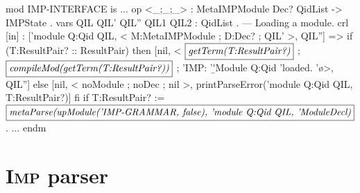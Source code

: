 \documentclass[a4paper,openany]{book}
\begin{document}
\begin{maude}[caption=\textsc{Imp}'s command-line interface in Maude, label=lst:imp-cli]
mod IMP-INTERFACE is 
 $\ldots$
 op <_;_;_> : MetaIMPModule Dec? QidList -> IMPState .
 vars QIL QIL' QIL'' QIL1 QIL2 : QidList .
 --- Loading a module.
 crl [in] : ['module Q:Qid QIL, < M:MetaIMPModule ; D:Dec? ; QIL' >, QIL''] => 
             if (T:ResultPair? :: ResultPair) then 
			              [nil, < $\fbox{\textit{getTerm(T:ResultPair?)}}$ ;
                          $\fbox{\textit{compileMod(getTerm(T:ResultPair?))}}$ ; 
                           'IMP: '\b 'Module Q:Qid 'loaded. '\o  >, QIL'']
             else [nil, < noModule ; noDec ; nil >, 
                      printParseError('module Q:Qid QIL, T:ResultPair?)]
             fi
 if T:ResultPair? :=
    $\fbox{\textit{metaParse(upModule('IMP-GRAMMAR, false), 'module Q:Qid QIL, 'ModuleDecl)}}$ .
 $\ldots$
endm
\end{maude}

\section{\textsc{Imp} parser}
\end{document}
